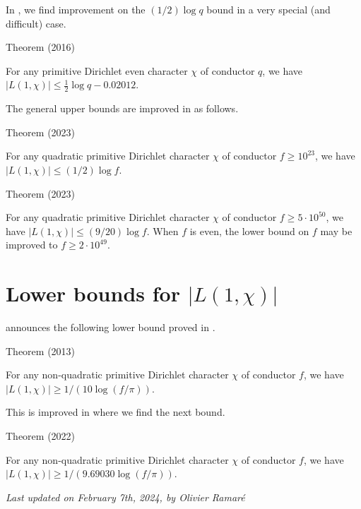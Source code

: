 In
\cite{SaadEddin*16},
we find improvement on the $(1/2)\log q$ bound in a very special (and
difficult) case.
\begin{thm}{Theorem (2016)}

For any primitive Dirichlet even character $\chi$ of conductor $q$,
we have
$ |L(1,\chi)|\le\tfrac12\log q - 0.02012 $.
\end{thm}



The general upper bounds are improved in
\cite{Johnston-Ramare-Trudgian*23}
as follows.

\begin{thm}{Theorem (2023)}

For any quadratic primitive Dirichlet character $\chi$ of conductor
$f\ge 10^{23}$,
we have $|L(1,\chi)|\le (1/ 2) \log f$. 
\end{thm}


\begin{thm}{Theorem (2023)}

For any quadratic primitive Dirichlet character $\chi$ of conductor
$f\ge 5\cdot 10^{50}$,
we have $|L(1,\chi)|\le (9/ 20) \log f$. When $f$ is even, the lower
bound on $f$ may be improved to $f\ge 2\cdot 10^{49}$.
\end{thm}




\section{Lower bounds for $|L(1,\chi)|$}

\cite{Louboutin*13}
announces the following lower bound proved in
\cite{Louboutin*15}
.

\begin{thm}{Theorem (2013)}

For any non-quadratic primitive Dirichlet character $\chi$ of conductor $f$,
we have $|L(1,\chi)|\ge 1/ ( 10\log(f/\pi))$.
\end{thm}


This is improved in
\cite{Mossinghoff-Starichkova-Trudgian*22}
where we find the next bound.
\begin{thm}{Theorem (2022)}

For any non-quadratic primitive Dirichlet character $\chi$ of conductor $f$,
we have $|L(1,\chi)|\ge 1/ ( 9.69030\log(f/\pi))$.
\end{thm}




 
 








  
\begin{flushright}\small\sl{}   Last updated on February 7th, 2024, by Olivier Ramar\'e
 \end{flushright}















